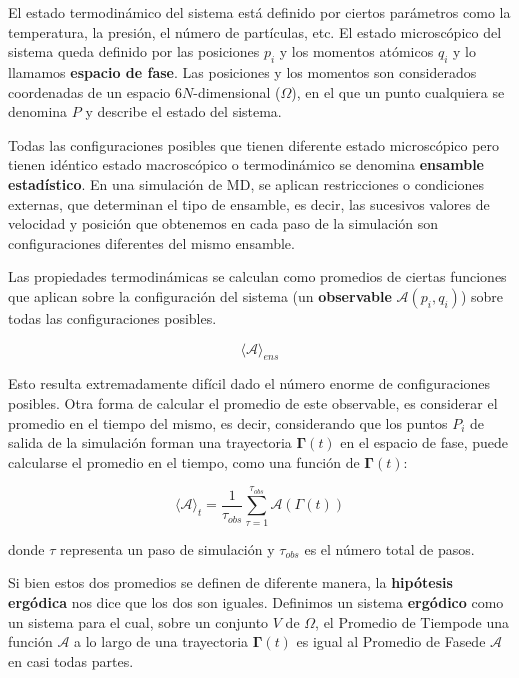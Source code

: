 El estado termodinámico del sistema está definido por ciertos parámetros como la temperatura, la presión, el número de partículas, etc. El estado microscópico del sistema queda definido por las posiciones $p_{i}$ y los momentos atómicos $q_{i}$ y lo llamamos \textbf{espacio de fase}. Las posiciones y los momentos son considerados coordenadas de un espacio $6N$-dimensional ($\Omega$), en el que un punto cualquiera se denomina $P$ y describe el estado del sistema. 

Todas las configuraciones posibles que tienen diferente estado microscópico pero tienen idéntico estado macroscópico o termodinámico se denomina \textbf{ensamble estadístico}. En una simulación de MD, se aplican restricciones o condiciones externas, que determinan el tipo de ensamble, es decir, las sucesivos valores de velocidad y posición que obtenemos en cada paso de la simulación son configuraciones diferentes del mismo ensamble.

Las propiedades termodinámicas se calculan como promedios de ciertas funciones que aplican sobre la configuración del sistema (un \textbf{observable} $\mathbf{\mathcal{A}}(p_{i},q_{i})$) sobre todas las configuraciones posibles.

\begin{equation}
\langle \mathbf{\mathcal{A}} \rangle _{ens}
\end{equation}

Esto resulta extremadamente difícil dado el número enorme de configuraciones posibles. Otra forma de calcular el promedio de este observable, es considerar el promedio en el tiempo del mismo, es decir, considerando que los puntos $P_{i}$ de salida de la simulación forman una trayectoria $\mathbf{\Gamma}(t)$ en el espacio de fase, puede calcularse el promedio en el tiempo, como una función de $\mathbf{\Gamma}(t)$:

\begin{equation}
\langle \mathbf{\mathcal{A}} \rangle _{t} = \frac{1}{\tau_{obs}} \sum_{\tau = 1}^{\tau_{obs}} \mathbf{\mathcal{A}}(\Gamma (t))
\end{equation}

donde $\tau$ representa un paso de simulación y $\tau_{obs}$ es el número total de pasos.

Si bien estos dos promedios se definen de diferente manera, la \textbf{hipótesis ergódica} nos dice que los dos son iguales. Definimos un sistema \textbf{ergódico} como un sistema para el cual, sobre un conjunto $V$ de $\Omega$, el Promedio de Tiempo\footnotemark[1] de una función $\mathbf{\mathcal{A}}$ a lo largo de una trayectoria $\mathbf{\Gamma}(t)$ es igual al Promedio de Fase\footnotemark[2] de $\mathbf{\mathcal{A}}$ en casi todas partes\footnotemark[3].


